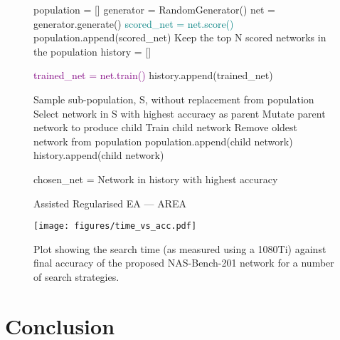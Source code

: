 \documentclass{article}
\begin{document}
\begin{figure}
\vspace{-2mm}
{\tiny
      \begin{algorithm}[H]
    \caption{Assisted Regularised EA --- AREA}
    \begin{algorithmic}[h]
           \State  population = []
                 \State  generator = RandomGenerator()
              \State net = generator.generate() 
              \State \textcolor{teal}{scored\_net = net.score()}
              \State population.append(scored\_net)
          \EndFor
          \State Keep the top N scored networks in the population
          \State history = []
              
              \State \textcolor{purple}{trained\_net = net.train()}
              \State history.append(trained\_net)
          \EndFor
               
               \State Sample sub-population, S, without replacement from population
               \State Select network in S with highest accuracy as parent
               \State Mutate parent network to produce child
               \State Train child network
               \State Remove oldest network from population 
               \State population.append(child network)
               \State history.append(child network)
               
          \EndWhile
    \State chosen\_net = Network in history with highest accuracy
    \end{algorithmic}
    
    \label{algo:oursrea}
    \end{algorithm}
}
\vspace{-3mm}
\end{figure}


\begin{figure}[!h]
\centering
                \texttt{[image: figures/time\_vs\_acc.pdf]}
\vspace{-3mm}
\caption{Plot showing the search time (as measured using a 1080Ti) against final accuracy of the proposed NAS-Bench-201 network for a number of search strategies.}
\label{fig:timeacc}
\vspace{-5mm}
\end{figure}

\vspace{-3mm}
\section{Conclusion}
\end{document}
